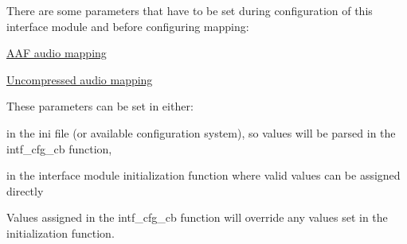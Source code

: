 There are some parameters that have to be set during configuration of this interface module and before configuring mapping\+:
\begin{DoxyItemize}
\item \hyperlink{aaf_audio_map}{A\+AF audio mapping}
\item \hyperlink{uncmp_audio_map}{Uncompressed audio mapping}
\end{DoxyItemize}

These parameters can be set in either\+:
\begin{DoxyItemize}
\item in the ini file (or available configuration system), so values will be parsed in the intf\+\_\+cfg\+\_\+cb function,
\item in the interface module initialization function where valid values can be assigned directly
\end{DoxyItemize}

Values assigned in the intf\+\_\+cfg\+\_\+cb function will override any values set in the initialization function. 